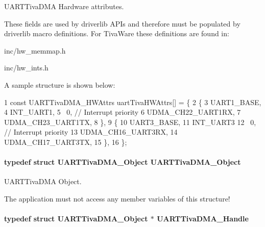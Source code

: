 U\+A\+R\+T\+Tiva\+D\+M\+A Hardware attributes. 

These fields are used by driverlib A\+P\+Is and therefore must be populated by driverlib macro definitions. For Tiva\+Ware these definitions are found in\+:
\begin{DoxyItemize}
\item inc/hw\+\_\+memmap.\+h
\item inc/hw\+\_\+ints.\+h
\end{DoxyItemize}

A sample structure is shown below\+: 
\begin{DoxyCode}
1 const UARTTivaDMA\_HWAttrs uartTivaHWAttrs[] = \{
2     \{
3         UART1\_BASE,
4         INT\_UART1,
5         ~0,        // Interrupt priority
6         UDMA\_CH22\_UART1RX,
7         UDMA\_CH23\_UART1TX,
8     \},
9     \{
10         UART3\_BASE,
11         INT\_UART3
12         ~0,        // Interrupt priority
13         UDMA\_CH16\_UART3RX,
14         UDMA\_CH17\_UART3TX,
15     \},
16 \};
\end{DoxyCode}
\paragraph[{U\+A\+R\+T\+Tiva\+D\+M\+A\+\_\+\+Object}]{\setlength{\rightskip}{0pt plus 5cm}typedef struct {\bf U\+A\+R\+T\+Tiva\+D\+M\+A\+\_\+\+Object}  {\bf U\+A\+R\+T\+Tiva\+D\+M\+A\+\_\+\+Object}}\label{_u_a_r_t_tiva_d_m_a_8h_ae68f92de73a22b2cdb1359930e949fc4}


U\+A\+R\+T\+Tiva\+D\+M\+A Object. 

The application must not access any member variables of this structure! 
\paragraph[{U\+A\+R\+T\+Tiva\+D\+M\+A\+\_\+\+Handle}]{\setlength{\rightskip}{0pt plus 5cm}typedef struct {\bf U\+A\+R\+T\+Tiva\+D\+M\+A\+\_\+\+Object} $\ast$ {\bf U\+A\+R\+T\+Tiva\+D\+M\+A\+\_\+\+Handle}}\label{_u_a_r_t_tiva_d_m_a_8h_ad1591b2fa5d54f24f2acf1920788b015}


